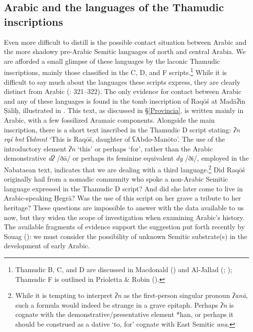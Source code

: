 \documentclass[output=paper]{langsci/langscibook}
\begin{document}
\subsection{Arabic and the languages of the Thamudic inscriptions}
Even more difficult to distill is the possible contact situation between Arabic and the more shadowy pre-Arabic Semitic languages of north and central Arabia. We are afforded a small glimpse of these languages by the laconic Thamudic inscriptions, mainly those classified in the C, D, and F scripts.\footnote{Thamudic B, C, and D are discussed in Macdonald (\citeyear{Macdonald2000}) and Al-Jallad (\citeyear{Al-Jallad2017early}; \citeyear{Al-Jallad2018ANA}); Thamudic F is outlined in Prioletta \& Robin (\citeyear{PriolettaRobin2018}).}  While it is difficult to say much about the languages these scripts express, they are clearly distinct from Arabic (\citealt{Al-Jallad2017early}: 321--322). The only evidence for contact between Arabic and any of these languages is found in the tomb inscription of Raqōś at Madāʔin Ṣāliḥ, illustrated in . This text, as discussed in §\ref{Provincia}, is written mainly in Arabic, with a few fossilized Aramaic components. Alongside the main inscription, there is a short text inscribed in the Thamudic D script stating: \textit{ʔn rqś bnt ʕbdmnt} ‘This is Raqōś, daughter of ʕAbdo-Manōto’. The use of the introductory element \textit{ʔn} `this' or perhaps `for', rather than the Arabic demonstrative \textit{dʔ} /ðā/ or perhaps its feminine equivalent \textit{dy} /ðī/, employed in the Nabataean text, indicates that we are dealing with a third language.\footnote{While it is tempting to interpret \textit{ʔn} as the first-person singular pronoun \textit{ʔanā}, such a formula would indeed be strange in a grave epitaph. Perhaps \textit{ʔn} is cognate with the demonstrative/presentative element *han, or perhaps it should be construed as a dative `to, for' cognate with East Semitic \textit{ana}.} Did Raqōś originally hail from a nomadic community who spoke a non-Arabic Semitic language expressed in the Thamudic D script? And did she later come to live in Arabic-speaking Ḥegrā? Was the use of this script on her grave a tribute to her heritage? These questions are impossible to answer with the data available to us now, but they widen the scope of investigation when examining Arabic’s history. The available fragments of evidence support the suggestion put forth recently by Souag (\citeyear{Souag2018blog}): we must consider the possibility of unknown Semitic substrate(s) in the development of early Arabic.
\end{document}
